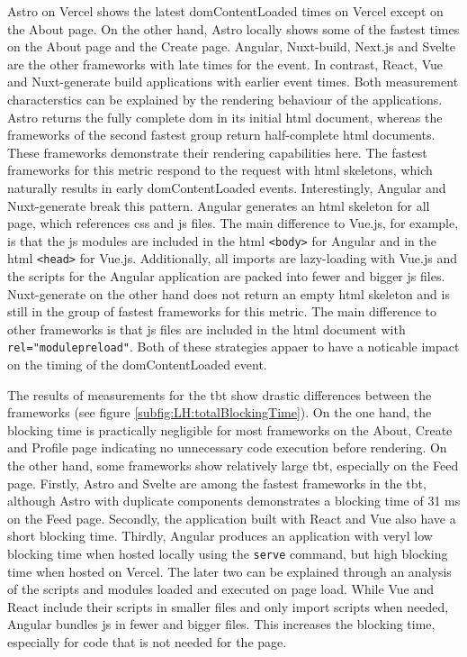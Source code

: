 \documentclass[a4paper, 10pt]{article}
\begin{document}
Astro on Vercel shows the latest domContentLoaded times on Vercel except on the About page.
On the other hand, Astro locally shows some of the fastest times on the About page and the Create page.
Angular, Nuxt-build, Next.js and Svelte are the other frameworks with late times for the event.
In contrast, React, Vue and Nuxt-generate build applications with earlier event times.
Both measurement characterstics can be explained by the rendering behaviour of the applications.
Astro returns the fully complete \acrshort{dom} in its initial \acrshort{html} document, whereas the frameworks of the second fastest group return half-complete \acrshort{html} documents.
These frameworks demonstrate their rendering capabilities here.
The fastest frameworks for this metric respond to the request with \acrshort{html} skeletons, which naturally results in early domContentLoaded events.
Interestingly, Angular and Nuxt-generate break this pattern.
Angular generates an \acrshort{html} skeleton for all page, which references \acrshort{css} and \acrshort{js} files.
The main difference to Vue.js, for example, is that the \acrshort{js} modules are included in the \acrshort{html} \verb|<body>| for Angular and in the \acrshort{html} \verb|<head>| for Vue.js.
Additionally, all imports are lazy-loading with Vue.js and the scripts for the Angular application are packed into fewer and bigger \acrshort{js} files.
Nuxt-generate on the other hand does not return an empty \acrshort{html} skeleton and is still in the group of fastest frameworks for this metric.
The main difference to other frameworks is that \acrshort{js} files are included in the \acrshort{html} document with \verb|rel="modulepreload"|.
Both of these strategies appaer to have a noticable impact on the timing of the domContentLoaded event.

The results of measurements for the \acrlong{tbt} show drastic differences between the frameworks (see figure \ref{subfig:LH:totalBlockingTime}).
On the one hand, the blocking time is practically negligible for most frameworks on the About, Create and Profile page indicating no unnecessary code execution before rendering.
On the other hand, some frameworks show relatively large \acrshort{tbt}, especially on the Feed page.
Firstly, Astro and Svelte are among the fastest frameworks in the \acrshort{tbt}, although Astro with duplicate components demonstrates a blocking time of 31 ms on the Feed page.
Secondly, the application built with React and Vue also have a short blocking time.
Thirdly, Angular produces an application with veryl low blocking time when hosted locally using the \verb|serve| command, but high blocking time when hosted on Vercel.
The later two can be explained through an analysis of the scripts and modules loaded and executed on page load.
While Vue and React include their scripts in smaller files and only import scripts when needed, Angular bundles \acrlong{js} in fewer and bigger files.
This increases the blocking time, especially for code that is not needed for the page.
\end{document}
